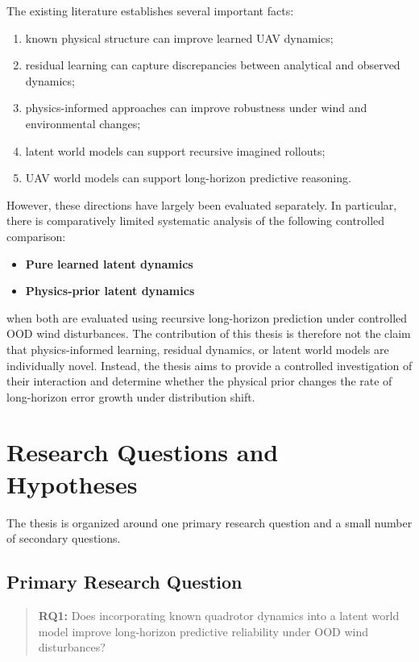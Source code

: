 \documentclass[conference]{IEEEtran}
\begin{document}
The existing literature establishes several important facts:

\begin{enumerate}
    \item known physical structure can improve learned UAV dynamics;
    \item residual learning can capture discrepancies between analytical
    and observed dynamics;
    \item physics-informed approaches can improve robustness under wind
    and environmental changes;
    \item latent world models can support recursive imagined rollouts;
    \item UAV world models can support long-horizon predictive reasoning.
\end{enumerate}

However, these directions have largely been evaluated separately.
In particular, there is comparatively limited systematic analysis of
the following controlled comparison:

\begin{itemize}
\item \textbf{Pure learned latent dynamics}
\item \textbf{Physics-prior latent dynamics}
\end{itemize}


when both are evaluated using recursive long-horizon prediction under
controlled OOD wind disturbances. The contribution of this thesis is therefore not the claim that
physics-informed learning, residual dynamics, or latent world models are
individually novel. Instead, the thesis aims to provide a controlled
investigation of their interaction and determine whether the physical
prior changes the rate of long-horizon error growth under distribution
shift.


\section{Research Questions and Hypotheses}


The thesis is organized around one primary research question and a
small number of secondary questions.

\subsection{Primary Research Question}

\begin{quote}
\textbf{RQ1:}
Does incorporating known quadrotor dynamics into a latent world model
improve long-horizon predictive reliability under OOD wind
disturbances?
\end{quote}
\end{document}
